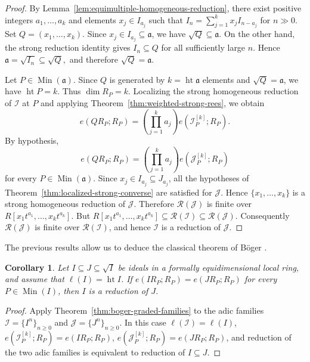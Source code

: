 \documentclass[reqno,12pt]{amsart}
\theoremstyle{plain}
\newtheorem{cor}[prop]{Corollary}
\theoremstyle{definition}
\theoremstyle{remark}
\numberwithin{equation}{section}
\begin{document}
\begin{proof}
By Lemma~\ref{lem:equimultiple-homogeneous-reduction}, there exist
positive integers $a_1,\ldots,a_k$ and elements
$x_j\in I_{a_j}$ such that $I_n=\sum_{j=1}^{k}x_jI_{n-a_j}$ for $n\gg0$.
Set $Q=(x_1,\ldots,x_k)$. Since $x_j\in I_{a_j}\subseteq\mathfrak a$, we have
$\sqrt Q\subseteq\mathfrak a$. On the other hand, the strong
reduction identity gives $I_n\subseteq Q$ for all sufficiently large
$n$. Hence $\mathfrak a=\sqrt{I_n}\subseteq\sqrt Q,$
and therefore $\sqrt Q=\mathfrak a$.

Let $P\in\operatorname{Min}(\mathfrak a)$. Since $Q$ is generated by
$k=\operatorname{ht}\mathfrak a$ elements and $\sqrt Q=\mathfrak a$,
we have $\operatorname{ht}P=k$. Thus $\dim R_P=k$. Localizing the strong homogeneous reduction of $\mathcal I$ at $P$
and applying Theorem~\ref{thm:weighted-strong-rees}, we obtain
\[
e(QR_P;R_P)
=
\left(\prod_{j=1}^{k}a_j\right)
e\!\left(\mathcal I_P^{[k]};R_P\right).
\]
By hypothesis,
\[
e(QR_P;R_P)
=
\left(\prod_{j=1}^{k}a_j\right)
e\!\left(\mathcal J_P^{[k]};R_P\right)
\]
for every $P\in\operatorname{Min}(\mathfrak a)$.
Since $x_j\in I_{a_j}\subseteq J_{a_j}$, all the hypotheses of
Theorem~\ref{thm:localized-strong-converse} are satisfied for
$\mathcal J$. Hence $\{x_1,\ldots,x_k\}$ is a strong homogeneous
reduction of $\mathcal J$. Therefore
$\mathcal R(\mathcal J)$ is finite over $R[x_1t^{a_1},\ldots,x_kt^{a_k}].$
But $R[x_1t^{a_1},\ldots,x_kt^{a_k}]
\subseteq
\mathcal R(\mathcal I)
\subseteq
\mathcal R(\mathcal J).$
Consequently $\mathcal R(\mathcal J)$ is finite over
$\mathcal R(\mathcal I)$, and hence $\mathcal I$ is a reduction of
$\mathcal J$.
\end{proof}

The previous results allow us to deduce  the classical theorem of B\"oger
\cite{Boger1969}. 
\begin{cor}
\label{cor:boger-specialization}
Let $I\subseteq J\subseteq\sqrt I$ be ideals in a formally
equidimensional local ring, and assume that
$\ell(I)=\operatorname{ht}I$. If $e(IR_P;R_P)=e(JR_P;R_P)$
for every $P\in\operatorname{Min}(I)$, then $I$ is a reduction of
$J$.
\end{cor}

\begin{proof}
Apply Theorem~\ref{thm:boger-graded-families} to the adic families
$\mathcal I=\{I^n\}_{n\geq0}$ and
$\mathcal J=\{J^n\}_{n\geq0}$.
In this case
$\ell(\mathcal I)=\ell(I)$, $e(\mathcal I_P^{[k]};R_P)=e(IR_P;R_P)$, $e(\mathcal J_P^{[k]};R_P)=e(JR_P;R_P)$,
and reduction of the two adic families is equivalent to reduction of
$I\subseteq J$.
\end{proof}
\end{document}
